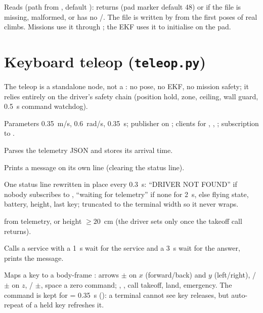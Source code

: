 Reads  (path from , default ):
returns  (pad marker default 48) or  if the file is missing,
malformed, or has no /. The file is written by  from the first poses of
real climbs. Missions use it through ; the EKF uses it to initialise on the pad.

\section{Keyboard teleop (\texorpdfstring{\texttt{teleop.py}}{teleop.py})}

The teleop is a standalone node, not a : no pose, no EKF, no mission safety; it relies entirely
on the driver's safety chain (position hold, zone, ceiling, wall guard, 0.5~s command watchdog).

Parameters  0.35~m/s,  0.6~rad/s,  0.35~s; publisher on
; clients for , , ;
subscription to .

Parses the telemetry JSON and stores its arrival time.

 Prints a message on its own line (clearing the status line).

One status line rewritten in place every 0.3~s: ``DRIVER NOT FOUND'' if nobody subscribes to
, ``waiting for telemetry'' if none for 2~s, else flying state, battery, height,
last key; truncated to the terminal width so it never wraps.

 from telemetry, or height $\ge 20$~cm (the driver sets  only once the takeoff call
returns).

Calls a  service with a 1~s wait for the service and a 3~s wait for the answer, prints the
message.

Maps a key to a body-frame : arrows $\pm$ on $x$ (forward/back) and $y$ (left/right),
/ $\pm$ on $z$, / $\pm$, space a zero command;
, ,  call takeoff, land, emergency. The command is kept for  = 0.35~s
(): a terminal cannot see key releases, but auto-repeat of a held key refreshes it.

